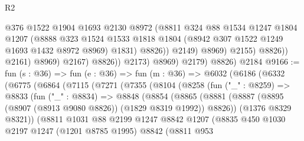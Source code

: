 \begin{lexlean}{R2}
\begin{coremodule}
                                  @376
                                  @1522
                                  @1904
                                  @1693
                                  @2130
                                  @8972
                                  (@8811
                                    @324
                                    @88
                                    @1534
                                    @1247
                                    @1804
                                    @1207
                                    (@8888
                                      @323
                                      @1524
                                      @1533
                                      @1818
                                      @1804
                                      (@8942 @307 @1522 @1249 @1693 @1432 @8972 @8969)
                                      @1831)
                                    @8826))
                                @2149)
                              @8969)
                            @2155)
                          @8826))
                      @2161)
                    @8969)
                  @2167)
                @8826))
            @2173)
          @8969)
        @2179)
      @8826)
    @2184
@9166 := fun (s : @36) =>
  fun (e : @36) =>
  fun (m : @36) =>
  @6032
    (@6186
      (@6332
        (@6775
          (@6864
            (@7115
              (@7271
                (@7355
                  (@8104
                    (@8258
                      (fun ("_" : @8259) =>
                      @8833
                        (fun ("_" : @8834) =>
                        @8848
                          (@8854
                            (@8865
                              (@8881
                                (@8887
                                  (@8895 (@8907 (@8913 @9080 @8826)) (@1829 @8319 @1992))
                                  @8826))
                              (@1376 @8329 @8321))
                            (@8811
                              @1031
                              @88
                              @2199
                              @1247
                              @8842
                              @1207
                              (@8835
                                @450
                                @1030
                                @2197
                                @1247
                                (@1201 @8785 @1995)
                                @8842
                                (@8811
                                  @953

\end{coremodule}
\end{lexlean}
